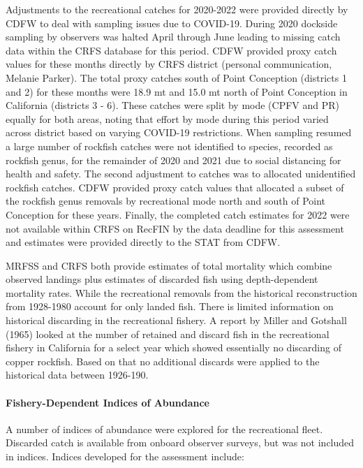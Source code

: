 \documentclass[11pt,
  english,
  letterpaper,
]{article}
\begin{document}
Adjustments to the recreational catches for 2020-2022 were provided directly by CDFW to deal with sampling issues due to COVID-19. During 2020 dockside sampling by observers was halted April through June leading to missing catch data within the CRFS database for this period. CDFW provided proxy catch values for these months directly by CRFS district (personal communication, Melanie Parker). The total proxy catches south of Point Conception (districts 1 and 2) for these months were 18.9 mt and 15.0 mt north of Point Conception in California (districts 3 - 6). These catches were split by mode (CPFV and PR) equally for both areas, noting that effort by mode during this period varied across district based on varying COVID-19 restrictions. When sampling resumed a large number of rockfish catches were not identified to species, recorded as rockfish genus, for the remainder of 2020 and 2021 due to social distancing for health and safety. The second adjustment to catches was to allocated unidentified rockfish catches. CDFW provided proxy catch values that allocated a subset of the rockfish genus removals by recreational mode north and south of Point Conception for these years. Finally, the completed catch estimates for 2022 were not available within CRFS on RecFIN by the data deadline for this assessment and estimates were provided directly to the STAT from CDFW.

MRFSS and CRFS both provide estimates of total mortality which combine observed landings plus estimates of discarded fish using depth-dependent mortality rates. While the recreational removals from the historical reconstruction from 1928-1980 account for only landed fish. There is limited information on historical discarding in the recreational fishery. A report by Miller and Gotshall (1965) looked at the number of retained and discard fish in the recreational fishery in California for a select year which showed essentially no discarding of copper rockfish. Based on that no additional discards were applied to the historical data between 1926-190.

\hypertarget{fishery-dependent-indices-of-abundance}{%
\paragraph{Fishery-Dependent Indices of Abundance}\label{fishery-dependent-indices-of-abundance}}

\hfill\break

A number of indices of abundance were explored for the recreational fleet. Discarded catch is available from onboard observer surveys, but was not included in indices. Indices developed for the assessment include:
\end{document}
